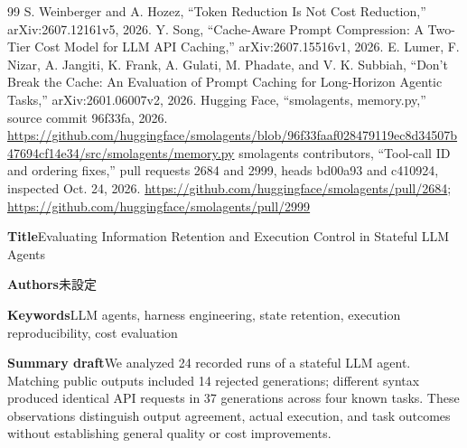 \documentclass[uplatex,a4paper,twocolumn,10pt]{jsarticle}
\begin{document}
\begin{thebibliography}{99}
 S. Weinberger and A. Hozez, ``Token Reduction Is Not Cost Reduction,'' arXiv:2607.12161v5, 2026.
 Y. Song, ``Cache-Aware Prompt Compression: A Two-Tier Cost Model for LLM API Caching,'' arXiv:2607.15516v1, 2026.
 E. Lumer, F. Nizar, A. Jangiti, K. Frank, A. Gulati, M. Phadate, and V. K. Subbiah, ``Don't Break the Cache: An Evaluation of Prompt Caching for Long-Horizon Agentic Tasks,'' arXiv:2601.06007v2, 2026.
 Hugging Face, ``smolagents, memory.py,'' source commit 96f33fa, 2026. \url{https://github.com/huggingface/smolagents/blob/96f33faaf028479119ec8d34507b47694cf14e34/src/smolagents/memory.py}
 smolagents contributors, ``Tool-call ID and ordering fixes,'' pull requests 2684 and 2999, heads bd00a93 and c410924, inspected Oct. 24, 2026. \url{https://github.com/huggingface/smolagents/pull/2684}; \url{https://github.com/huggingface/smolagents/pull/2999}
\end{thebibliography}

\clearpage
\onecolumn
\noindent\textbf{Title}\quad Evaluating Information Retention and Execution Control in Stateful LLM Agents

\noindent\textbf{Authors}\quad 未設定

\noindent\textbf{Keywords}\quad LLM agents, harness engineering, state retention, execution reproducibility, cost evaluation

\noindent\textbf{Summary draft}\quad We analyzed 24 recorded runs of a stateful LLM agent. Matching public outputs included 14 rejected generations; different syntax produced identical API requests in 37 generations across four known tasks. These observations distinguish output agreement, actual execution, and task outcomes without establishing general quality or cost improvements.
\end{document}
